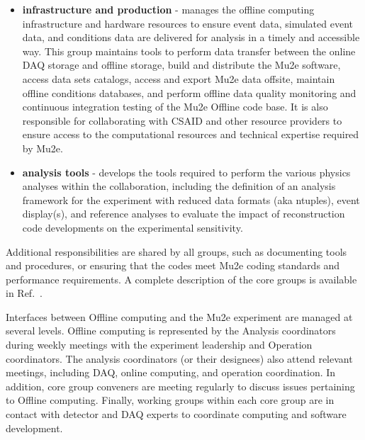 \begin{itemize}
\item[] {\bf infrastructure and production} - manages the offline computing infrastructure and hardware resources to ensure event data, simulated event data, and conditions data are delivered for analysis in a timely and accessible way. This group maintains tools to perform data transfer between the online DAQ storage and offline storage, build and distribute the Mu2e software, access data sets catalogs, access and export Mu2e data offsite, maintain offline conditions databases, and perform offline data quality monitoring and continuous integration testing of the Mu2e Offline code base. It is also responsible for collaborating with CSAID and other resource providers to ensure access to the computational resources and technical expertise required by Mu2e.

\item[] {\bf analysis tools} - develops the tools required to perform the various physics analyses within the collaboration, including the definition of an analysis framework for the experiment with reduced data formats (aka ntuples), event display(s), and reference analyses to evaluate the impact of reconstruction code developments on the experimental sensitivity.

\end{itemize}

Additional responsibilities are shared by all groups, such as documenting tools and procedures, or ensuring that the codes meet Mu2e coding standards and performance requirements. A complete description of the core groups is available in Ref.~\cite{docdb48639}. 

Interfaces between Offline computing and the Mu2e experiment are managed at several levels. Offline computing is represented by the Analysis coordinators during weekly meetings with the experiment leadership and Operation coordinators. The analysis coordinators (or their designees)  also attend relevant meetings, including DAQ, online computing, and operation coordination. In addition, core group conveners are meeting regularly to discuss issues pertaining to Offline computing. Finally, working groups within each core group are in contact with detector and DAQ experts to coordinate computing and software development.


